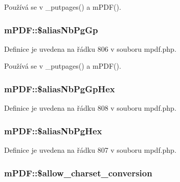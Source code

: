 Používá se v \-\_\-putpages() a m\-P\-D\-F().

\hypertarget{classm_p_d_f_a2876b7c1214ab4c13f3a57feafe7d990}{
\subsubsection[{\$alias\-Nb\-Pg\-Gp}]{\setlength{\rightskip}{0pt plus 5cm}m\-P\-D\-F\-::\$alias\-Nb\-Pg\-Gp}}\label{classm_p_d_f_a2876b7c1214ab4c13f3a57feafe7d990}


Definice je uvedena na řádku 806 v souboru mpdf.\-php.



Používá se v \-\_\-putpages() a m\-P\-D\-F().

\hypertarget{classm_p_d_f_a3c910ff70fb123eeb47494a205f3edaf}{
\subsubsection[{\$alias\-Nb\-Pg\-Gp\-Hex}]{\setlength{\rightskip}{0pt plus 5cm}m\-P\-D\-F\-::\$alias\-Nb\-Pg\-Gp\-Hex}}\label{classm_p_d_f_a3c910ff70fb123eeb47494a205f3edaf}


Definice je uvedena na řádku 808 v souboru mpdf.\-php.

\hypertarget{classm_p_d_f_a6b869b54dad9003d814aea0122b9f66f}{
\subsubsection[{\$alias\-Nb\-Pg\-Hex}]{\setlength{\rightskip}{0pt plus 5cm}m\-P\-D\-F\-::\$alias\-Nb\-Pg\-Hex}}\label{classm_p_d_f_a6b869b54dad9003d814aea0122b9f66f}


Definice je uvedena na řádku 807 v souboru mpdf.\-php.

\hypertarget{classm_p_d_f_a675f374113c0c45cb77f66bdb234848d}{
\subsubsection[{\$allow\-\_\-charset\-\_\-conversion}]{\setlength{\rightskip}{0pt plus 5cm}m\-P\-D\-F\-::\$allow\-\_\-charset\-\_\-conversion}}\label{classm_p_d_f_a675f374113c0c45cb77f66bdb234848d}


